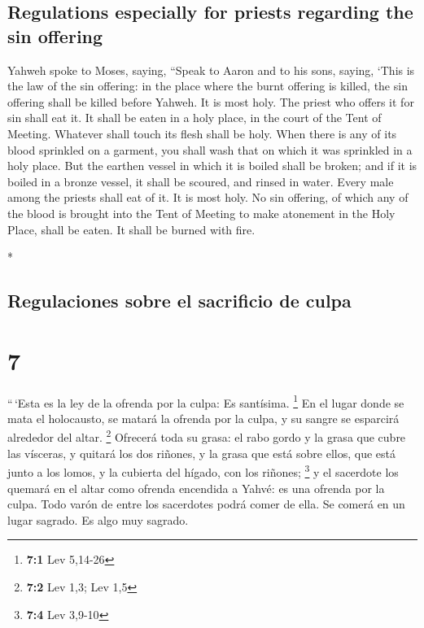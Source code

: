 \begin{paracol}{2}
\begin{otherlanguage}{english}
\hypertarget{regulations-especially-for-priests-regarding-the-sin-offering}{%
\subsection{Regulations especially for priests regarding the sin
offering}\label{regulations-especially-for-priests-regarding-the-sin-offering}}

 Yahweh spoke to Moses, saying,  ``Speak
to Aaron and to his sons, saying, `This is the law of the sin offering:
in the place where the burnt offering is killed, the sin offering shall
be killed before Yahweh. It is most holy.  The priest who
offers it for sin shall eat it. It shall be eaten in a holy place, in
the court of the Tent of Meeting.  Whatever shall touch
its flesh shall be holy. When there is any of its blood sprinkled on a
garment, you shall wash that on which it was sprinkled in a holy place.
 But the earthen vessel in which it is boiled shall be
broken; and if it is boiled in a bronze vessel, it shall be scoured, and
rinsed in water.  Every male among the priests shall eat
of it. It is most holy.  No sin offering, of which any of
the blood is brought into the Tent of Meeting to make atonement in the
Holy Place, shall be eaten. It shall be burned with fire.

\end{otherlanguage}

\switchcolumn[0]*

\hypertarget{regulaciones-sobre-el-sacrificio-de-culpa}{%
\subsection{Regulaciones sobre el sacrificio de
culpa}\label{regulaciones-sobre-el-sacrificio-de-culpa}}

\hypertarget{section-12}{%
\section{7}\label{section-12}}

 ``\,`Esta es la ley de la ofrenda por la culpa: Es
santísima. \footnote{\textbf{7:1} Lev 5,14-26}  En el
lugar donde se mata el holocausto, se matará la ofrenda por la culpa, y
su sangre se esparcirá alrededor del altar. \footnote{\textbf{7:2} Lev
  1,3; Lev 1,5}  Ofrecerá toda su grasa: el rabo gordo y
la grasa que cubre las vísceras,  y quitará los dos
riñones, y la grasa que está sobre ellos, que está junto a los lomos, y
la cubierta del hígado, con los riñones; \footnote{\textbf{7:4} Lev
  3,9-10}  y el sacerdote los quemará en el altar como
ofrenda encendida a Yahvé: es una ofrenda por la culpa. 
Todo varón de entre los sacerdotes podrá comer de ella. Se comerá en un
lugar sagrado. Es algo muy sagrado.


\end{paracol}
